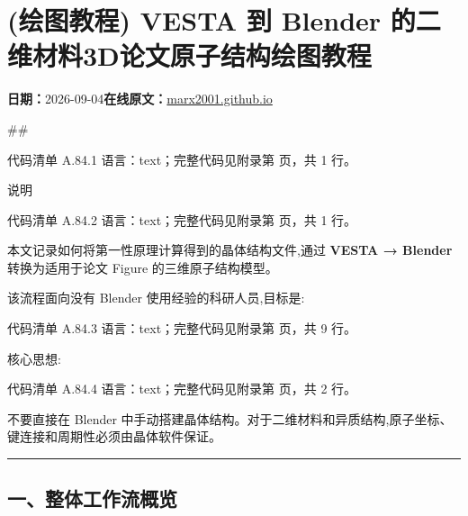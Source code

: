 \documentclass[lang=cn,scheme=chinese,color=blue,device=normal,toc=onecol,math=cm]{elegantbook}
\begin{document}
\section{(绘图教程) VESTA 到 Blender 的二维材料3D论文原子结构绘图教程}
\begin{articlemeta}
\textbf{日期：}2026-09-04\hfill\textbf{在线原文：}\href{https://marx2001.github.io/sci-note\_posts/20260904-vesta-blender}{marx2001.github.io}
\end{articlemeta}

\#\#\par


\begin{codeindexbox}{代码清单 A.84.1}
语言：text；完整代码见附录第 \pageref{code:84:1} 页，共 1 行。
\end{codeindexbox}


说明\par


\begin{codeindexbox}{代码清单 A.84.2}
语言：text；完整代码见附录第 \pageref{code:84:2} 页，共 1 行。
\end{codeindexbox}


本文记录如何将第一性原理计算得到的晶体结构文件,通过 \textbf{VESTA → Blender} 转换为适用于论文 Figure 的三维原子结构模型。\par


该流程面向没有 Blender 使用经验的科研人员,目标是:\par


\begin{codeindexbox}{代码清单 A.84.3}
语言：text；完整代码见附录第 \pageref{code:84:3} 页，共 9 行。
\end{codeindexbox}


核心思想:\par


\begin{codeindexbox}{代码清单 A.84.4}
语言：text；完整代码见附录第 \pageref{code:84:4} 页，共 2 行。
\end{codeindexbox}


不要直接在 Blender 中手动搭建晶体结构。对于二维材料和异质结构,原子坐标、键连接和周期性必须由晶体软件保证。\par


\medskip\hrule\medskip


\subsection{一、整体工作流概览}
\end{document}
